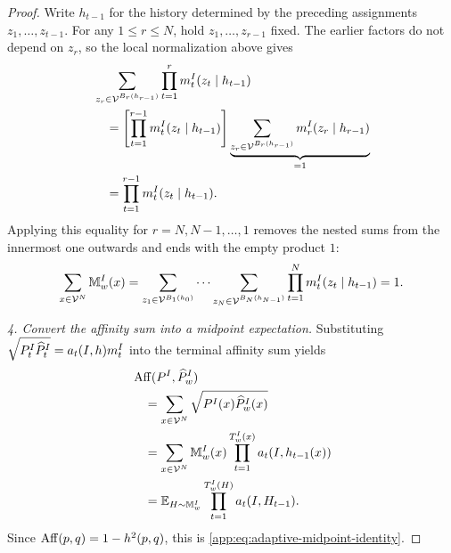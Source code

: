 \begin{proof}
Write \(h_{t-1}\) for the history determined by the preceding assignments
\(z_1,\ldots,z_{t-1}\).  For any \(1\le r\le N\), hold
\(z_1,\ldots,z_{r-1}\) fixed.  The earlier factors do not depend on \(z_r\),
so the local normalization above gives
\begin{align*}
 &\sum_{z_r\in\Vocab^{B_r(h_{r-1})}}
   \prod_{t=1}^{r}\HardMidpointKernel{t}{I}(z_t\mid h_{t-1})\\
 &\quad=
   \left[\prod_{t=1}^{r-1}
     \HardMidpointKernel{t}{I}(z_t\mid h_{t-1})\right]
   \underbrace{\sum_{z_r\in\Vocab^{B_r(h_{r-1})}}
     \HardMidpointKernel{r}{I}(z_r\mid h_{r-1})}_{=1}\\
 &\quad=\prod_{t=1}^{r-1}
     \HardMidpointKernel{t}{I}(z_t\mid h_{t-1}).
\end{align*}
Applying this equality for \(r=N,N-1,\ldots,1\) removes the nested sums
from the innermost one outwards and ends with the empty product \(1\):
\[
 \sum_{x\in\Vocab^N}\HardMidpointLaw{I}{w}(x)
 =\sum_{z_1\in\Vocab^{B_1(h_0)}}\cdots
  \sum_{z_N\in\Vocab^{B_N(h_{N-1})}}
   \prod_{t=1}^{N}\HardMidpointKernel{t}{I}(z_t\mid h_{t-1})
 =1.
\]

\emph{4. Convert the affinity sum into a midpoint expectation.}
Substituting
\(\sqrt{\HardExactBatchLaw{t}{I}\HardProductBatchLaw{t}{I}}
 =\HardLocalAffinity{t}{I,h}\HardMidpointKernel{t}{I}\) into the terminal
affinity sum yields
\begin{align*}
 &\HellingerAffinity(
    \HardTargetLaw{I},\HardOutputLaw{I}{w})\\
 &\quad=\sum_{x\in\Vocab^N}
  \sqrt{\HardTargetLaw{I}(x)\HardOutputLaw{I}{w}(x)}\\
 &\quad=\sum_{x\in\Vocab^N}
  \HardMidpointLaw{I}{w}(x)
  \prod_{t=1}^{\HardTerminalRoundCount{I}{w}{x}}
   \HardLocalAffinity{t}{I,h_{t-1}(x)}\\
 &\quad=\mathbb E_{H\sim\HardMidpointLaw{I}{w}}
  \prod_{t=1}^{\HardTerminalRoundCount{I}{w}{H}}
   \HardLocalAffinity{t}{I,H_{t-1}}.
\end{align*}
Since \(\HellingerAffinity(p,q)=1-\sqHellinger(p,q)\), this is
\eqref{app:eq:adaptive-midpoint-identity}.
\end{proof}

